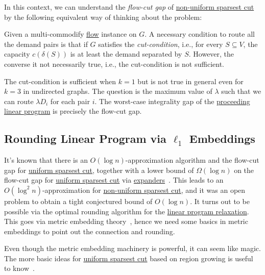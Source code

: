 In this context, we can understand the \emph{flow-cut gap} of \hyperref[prb:non-uniform-sparsest-cut]{non-uniform sparsest cut} by the following equivalent way of thinking about the problem:

\begin{intuition}
	Given a multi-commodify \hyperref[def:flow]{flow} instance on \(G\). A necessary condition to route all the demand pairs is that if \(G\) satisfies the \emph{cut-condition}, i.e., for every \(S \subseteq V\), the capacity \(c(\delta (S))\) is at least the demand separated by \(S\). However, the converse it not necessarily true, i.e., the cut-condition is not sufficient.
\end{intuition}

The cut-condition is sufficient when \(k = 1\) but is not true in general even for \(k = 3\) in undirected graphs. The question is the maximum value of \(\lambda \) such that we can route \(\lambda D_i\) for each pair \(i\). The worst-case integrality gap of the \hyperref[eq:non-uniform-sparsest-cut-LP-primal]{proceeding linear program} is precisely the flow-cut gap.

\subsection{Rounding Linear Program via \(\ell _1\) Embeddings}
It's known that there is an \(O(\log n)\)-approximation algorithm and the flow-cut gap for \hyperref[prb:sparsest-cut]{uniform sparsest cut}, together with a lower bound of \(\Omega (\log n)\) on the flow-cut gap for \hyperref[prb:sparsest-cut]{uniform sparsest cut} via \hyperref[def:expander]{expanders}~\cite{leighton1999multicommodity}. This leads to an \(O(\log ^2 n)\)-approximation for \hyperref[prb:non-uniform-sparsest-cut]{non-uniform sparsest cut}, and it was an open problem to obtain a tight conjectured bound of \(O(\log n)\). It turns out to be possible via the optimal rounding algorithm for the \hyperref[eq:non-uniform-sparsest-cut-LP-primal]{linear program relaxation}. This goes via metric embedding theory~\cite{linial1995geometry,aumann1998log}, hence we need some basics in metric embeddings to point out the connection and rounding.

\begin{note}
	Even though the metric embedding machinery is powerful, it can seem like magic. The more basic ideas for \hyperref[prb:sparsest-cut]{uniform sparsest cut} based on region growing is useful to know~\cite{williamson2011design}.
\end{note}

